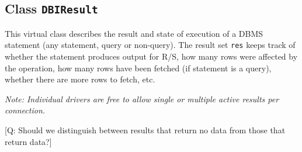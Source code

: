 \documentclass{article}
\newcommand{\sobj}[1]{\mbox{\tt #1}}    %
\newcommand{\sclass}[1]{\mbox{\tt #1}}  %
\begin{document}
\subsection{Class \sclass{DBIResult}}\label{sec:DBIResult}

This virtual class describes the result and state of execution of
a DBMS statement (any statement, query or non-query).  The result set
\sobj{res} keeps track of whether the statement produces output
for R/S, how many rows were affected by the operation, how many
rows have been fetched (if statement is a query), whether there
are more rows to fetch, etc.  

\emph{Note: Individual drivers are free to allow single or multiple
active results per connection.
}

[Q: Should we distinguish between results that return no data from those
that return data?]
\end{document}

